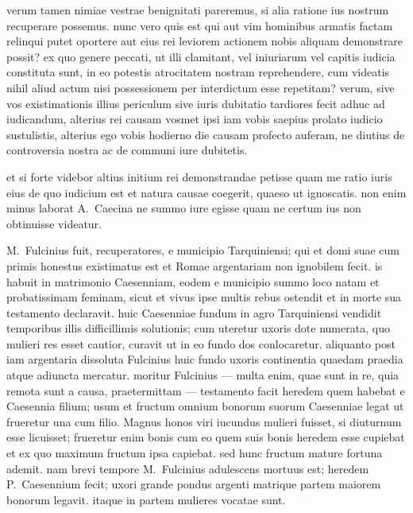  verum tamen nimiae vestrae benignitati pareremus, si alia ratione ius nostrum recuperare possemus. nunc vero quis est qui aut vim hominibus armatis factam relinqui putet oportere aut eius rei leviorem actionem nobis aliquam demonstrare possit? ex quo genere peccati, ut illi clamitant, vel iniuriarum vel capitis iudicia constituta sunt, in eo potestis atrocitatem nostram reprehendere, cum videatis nihil aliud actum nisi possessionem per interdictum esse repetitam? verum, sive vos existimationis illius periculum sive iuris dubitatio tardiores fecit adhuc ad iudicandum, alterius rei causam vosmet ipsi iam vobis saepius prolato iudicio sustulistis, alterius ego vobis hodierno die causam profecto auferam, ne diutius de controversia nostra ac de communi iure dubitetis.

 et si forte videbor altius initium rei demonstrandae petisse quam me ratio iuris eius de quo iudicium est et natura causae coegerit, quaeso ut ignoscatis. non enim minus laborat A.~Caecina ne summo iure egisse quam ne certum ius non obtinuisse videatur.

M.~Fulcinius fuit, recuperatores, e municipio Tarquiniensi; qui et domi suae cum primis honestus existimatus est et Romae argentariam non ignobilem fecit. is habuit in matrimonio Caesenniam, eodem e municipio summo loco natam et probatissimam feminam, sicut et vivus ipse multis rebus ostendit et in morte sua testamento declaravit.
 huic Caesenniae fundum in agro Tarquiniensi vendidit temporibus illis difficillimis solutionis; cum uteretur uxoris dote numerata, quo mulieri res esset cautior, curavit ut in eo fundo dos conlocaretur. aliquanto post iam argentaria dissoluta Fulcinius huic fundo uxoris continentia quaedam praedia atque adiuncta mercatur. moritur Fulcinius — multa enim, quae sunt in re, quia remota sunt a causa, praetermittam — testamento facit heredem quem habebat e Caesennia filium; usum et fructum omnium bonorum suorum Caesenniae legat ut frueretur una cum filio.  Magnus honos viri iucundus mulieri fuisset, si diuturnum esse licuisset; frueretur enim bonis cum eo quem suis bonis heredem esse cupiebat et ex quo maximum fructum ipsa capiebat. sed hunc fructum mature fortuna ademit. nam brevi tempore M.~Fulcinius adulescens mortuus est; heredem P.~Caesennium fecit; uxori grande pondus argenti matrique partem maiorem bonorum legavit. itaque in partem mulieres vocatae sunt.

